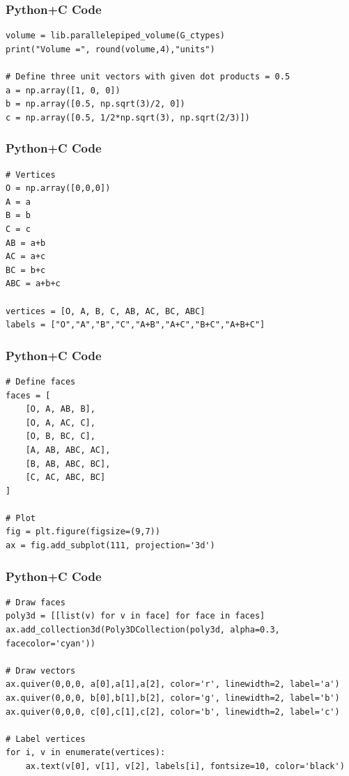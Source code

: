 \documentclass{beamer}
\begin{document}
\begin{frame}[fragile]
    \frametitle{Python+C Code}
    \begin{lstlisting}
volume = lib.parallelepiped_volume(G_ctypes)
print("Volume =", round(volume,4),"units")

# Define three unit vectors with given dot products = 0.5
a = np.array([1, 0, 0])
b = np.array([0.5, np.sqrt(3)/2, 0])                 
c = np.array([0.5, 1/2*np.sqrt(3), np.sqrt(2/3)])   

    \end{lstlisting}
\end{frame}

\begin{frame}[fragile]
    \frametitle{Python+C Code}
    \begin{lstlisting}
# Vertices
O = np.array([0,0,0])
A = a
B = b
C = c
AB = a+b
AC = a+c
BC = b+c
ABC = a+b+c

vertices = [O, A, B, C, AB, AC, BC, ABC]
labels = ["O","A","B","C","A+B","A+C","B+C","A+B+C"]

    \end{lstlisting}
\end{frame}

\begin{frame}[fragile]
    \frametitle{Python+C Code}
    \begin{lstlisting}
# Define faces
faces = [
    [O, A, AB, B],
    [O, A, AC, C],
    [O, B, BC, C],
    [A, AB, ABC, AC],
    [B, AB, ABC, BC],
    [C, AC, ABC, BC]
]

# Plot
fig = plt.figure(figsize=(9,7))
ax = fig.add_subplot(111, projection='3d')

    \end{lstlisting}
\end{frame}

\begin{frame}[fragile]
    \frametitle{Python+C Code}
    \begin{lstlisting}
# Draw faces
poly3d = [[list(v) for v in face] for face in faces]
ax.add_collection3d(Poly3DCollection(poly3d, alpha=0.3, facecolor='cyan'))

# Draw vectors
ax.quiver(0,0,0, a[0],a[1],a[2], color='r', linewidth=2, label='a')
ax.quiver(0,0,0, b[0],b[1],b[2], color='g', linewidth=2, label='b')
ax.quiver(0,0,0, c[0],c[1],c[2], color='b', linewidth=2, label='c')

# Label vertices
for i, v in enumerate(vertices):
    ax.text(v[0], v[1], v[2], labels[i], fontsize=10, color='black')


    \end{lstlisting}
\end{frame}
\end{document}
